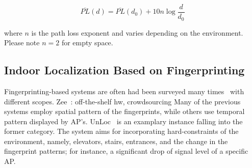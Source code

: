     \begin{equation}
        \label{eq:log-distance}
        \overline{PL}(d) = \overline{PL}(d_0) + 10 n \log{\dfrac{d}{d_0}}
    \end{equation}

    \noindent where $n$ is the path loss exponent and varies depending on the environment.
    Please note $n = 2$ for empty space.


    \subsection{Indoor Localization Based on Fingerprinting}
    Fingerprinting-based systems are often   had been surveyed many times~\cite{he2016wi} with different scopes.
    Zee~\cite{rai2012zee}: off-the-shelf hw, crowdsourcing
    Many of the previous systems employ spatial pattern of the fingerprints, while others use temporal pattern displayed by AP's.
    UnLoc~\cite{wang2012no} is an examplary instance falling into the former category.
    The system aims for incorporating hard-constraints of the environment, namely, elevators, stairs, entrances, and the change in the fingerprint patterns; for instance, a significant drop of signal level of a specific AP\@.


